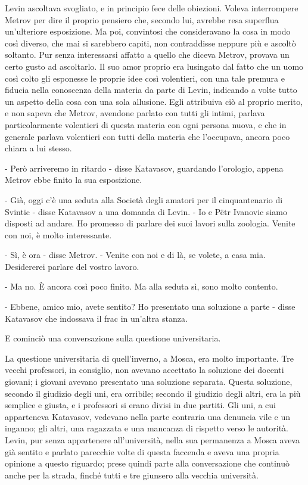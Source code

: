 Levin ascoltava svogliato, e in principio fece delle obiezioni. Voleva interrompere Metrov per dire il proprio pensiero che, secondo lui, avrebbe resa superflua un'ulteriore esposizione. Ma poi, convintosi che consideravano la cosa in modo così diverso, che mai si sarebbero capiti, non contraddisse neppure più e ascoltò soltanto. Pur senza interessarsi affatto a quello che diceva Metrov, provava un certo gusto ad ascoltarlo. Il suo amor proprio era lusingato dal fatto che un uomo così colto gli esponesse le proprie idee così volentieri, con una tale premura e fiducia nella conoscenza della materia da parte di Levin, indicando a volte tutto un aspetto della cosa con una sola allusione. Egli attribuiva ciò al proprio merito, e non sapeva che Metrov, avendone parlato con tutti gli intimi, parlava particolarmente volentieri di questa materia con ogni persona nuova, e che in generale parlava volentieri con tutti della materia che l'occupava, ancora poco chiara a lui stesso. 

- Però arriveremo in ritardo - disse Katavasov, guardando l'orologio, appena Metrov ebbe finito la sua esposizione. 

- Già, oggi c'è una seduta alla Società degli amatori per il cinquantenario di Svintic - disse Katavasov a una domanda di Levin. - Io e Pëtr Ivanovic siamo disposti ad andare. Ho promesso di parlare dei suoi lavori sulla zoologia. Venite con noi, è molto interessante. 

- Sì, è ora - disse Metrov. - Venite con noi e di là, se volete, a casa mia. Desidererei parlare del vostro lavoro. 

- Ma no. È ancora così poco finito. Ma alla seduta sì, sono molto contento. 

- Ebbene, amico mio, avete sentito? Ho presentato una soluzione a parte - disse Katavasov che indossava il frac in un'altra stanza. 

E cominciò una conversazione sulla questione universitaria. 

La questione universitaria di quell'inverno, a Mosca, era molto importante. Tre vecchi professori, in consiglio, non avevano accettato la soluzione dei docenti giovani; i giovani avevano presentato una soluzione separata. Questa soluzione, secondo il giudizio degli uni, era orribile; secondo il giudizio degli altri, era la più semplice e giusta, e i professori si erano divisi in due partiti. Gli uni, a cui apparteneva Katavasov, vedevano nella parte contraria una denuncia vile e un inganno; gli altri, una ragazzata e una mancanza di rispetto verso le autorità. Levin, pur senza appartenere all'università, nella sua permanenza a Mosca aveva già sentito e parlato parecchie volte di questa faccenda e aveva una propria opinione a questo riguardo; prese quindi parte alla conversazione che continuò anche per la strada, finché tutti e tre giunsero alla vecchia università. 

